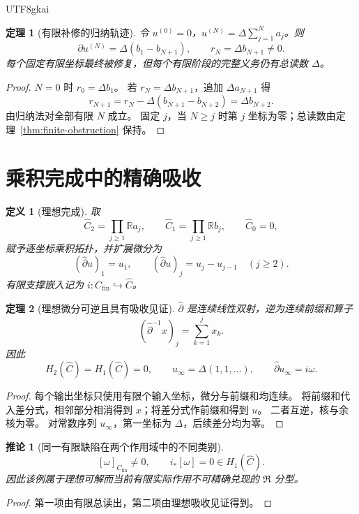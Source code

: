 \documentclass[12pt,a4paper,openany]{report}
\newtheorem{definition}{定义}[chapter]
\newtheorem{theorem}{定理}[chapter]
\newtheorem{corollary}{推论}[chapter]
\numberwithin{equation}{chapter}
\newcommand{\RR}{\mathbb R}
\newcommand{\cfin}{C_{\mathrm{fin}}}
\newcommand{\chat}{\widehat C}
\begin{document}
\begin{CJK*}{UTF8}{gkai}
\begin{theorem}[有限补修的归纳轨迹]
\label{thm:prefix}
令 $u^{(0)}=0$，$u^{(N)}=\Delta\sum_{j=1}^Na_j$。则
\[
 \partial u^{(N)}=\Delta(b_1-b_{N+1}),\qquad
 \boxed{r_N=\Delta b_{N+1}\ne0}.
\]
每个固定有限坐标最终被修复，但每个有限阶段的完整义务仍有总读数 $\Delta$。
\end{theorem}
\begin{proof}
$N=0$ 时 $r_0=\Delta b_1$。
若 $r_N=\Delta b_{N+1}$，追加 $\Delta a_{N+1}$ 得
\[
 r_{N+1}
 =r_N-\Delta(b_{N+1}-b_{N+2})
 =\Delta b_{N+2}.
\]
由归纳法对全部有限 $N$ 成立。
固定 $j$，当 $N\ge j$ 时第 $j$ 坐标为零；总读数由定理~\ref{thm:finite-obstruction} 保持。
\end{proof}

\section{乘积完成中的精确吸收}

\begin{definition}[理想完成]
\label{def:completion}
取
\[
 \widehat C_2=\prod_{j\ge1}\RR a_j,\qquad
 \widehat C_1=\prod_{j\ge1}\RR b_j,\qquad \widehat C_0=0,
\]
赋予逐坐标乘积拓扑，并扩展微分为
\[
 (\widehat\partial u)_1=u_1,\qquad
 (\widehat\partial u)_j=u_j-u_{j-1}\quad(j\ge2).
\]
有限支撑嵌入记为 $i:\cfin\hookrightarrow\chat$。
\end{definition}

\begin{theorem}[理想微分可逆且具有吸收见证]
\label{thm:ideal-absorption}
$\widehat\partial$ 是连续线性双射，逆为连续前缀和算子
\[
 (\widehat\partial^{-1}x)_j=\sum_{k=1}^j x_k.
\]
因此
\[
 H_2(\chat)=H_1(\chat)=0,\qquad
 u_\infty=\Delta(1,1,\ldots),\qquad
 \boxed{\widehat\partial u_\infty=i\omega}.
\]
\end{theorem}
\begin{proof}
每个输出坐标只使用有限个输入坐标，微分与前缀和均连续。
将前缀和代入差分式，相邻部分相消得到 $x$；将差分式作前缀和得到 $u$。
二者互逆，核与余核为零。
对常数序列 $u_\infty$，第一坐标为 $\Delta$，后续差分均为零。
\end{proof}

\begin{corollary}[同一有限缺陷在两个作用域中的不同类别]
\[
 [\omega]_{\cfin}\ne0,\qquad i_*[\omega]=0\in H_1(\chat).
\]
因此该例属于理想可解而当前有限实际作用不可精确兑现的 $\mathfrak R$ 分型。
\end{corollary}
\begin{proof}
第一项由有限总读出，第二项由理想吸收见证得到。
\end{proof}


\end{CJK*}
\end{document}
